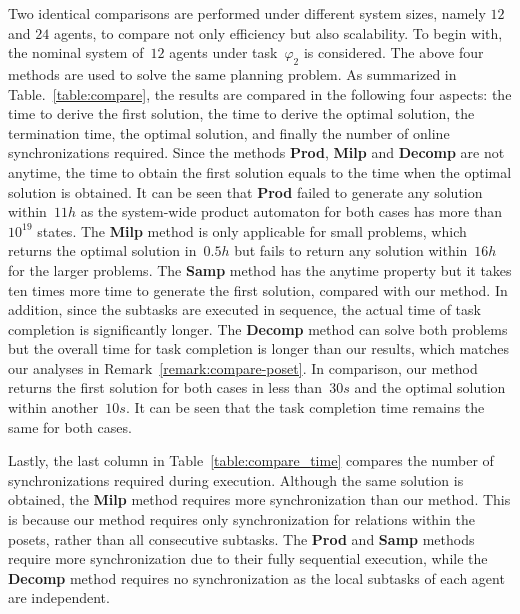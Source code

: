 Two identical comparisons are performed under different system sizes,
namely $12$ and $24$ agents, to compare not only efficiency but also scalability.
To begin with, the nominal system of~$12$ agents under task~$\varphi_2$ is considered.
The above four methods are used to solve the same planning problem.
As summarized in Table.~\ref{table:compare},
the results are compared in the following four aspects:
the time to derive the first solution,
the time to derive the optimal solution,
the termination time, the optimal solution,
and finally the number of online synchronizations required.
Since the methods \textbf{Prod}, \textbf{Milp} and \textbf{Decomp} are not
anytime, the time to obtain  the first solution equals to the time
when the optimal solution is obtained.
It can be seen that \textbf{Prod} failed to generate any solution
within~$11h$ as the system-wide product automaton for both cases
has more than $10^{19}$ states.
The \textbf{Milp} method is only applicable for small problems,
which returns the optimal solution in~$0.5h$ but fails to
return any solution within~$16h$ for the larger problems.
The \textbf{Samp} method has the anytime property but it takes ten times
more time to generate
the first  solution, compared with our method.
In addition, since the subtasks are executed in sequence,
the actual time of task completion is significantly longer.
The \textbf{Decomp} method can solve both problems but the overall time
for task completion is longer than our results,
which matches our analyses in Remark~\ref{remark:compare-poset}.
In comparison, our method returns the first solution for both cases in less
than~$30s$ and the optimal solution within another~$10s$.
It can be seen that the task completion time remains the same for both cases.

Lastly, the last column in Table~\ref{table:compare_time} compares the number
of synchronizations required during execution.
Although the same solution is obtained, the \textbf{Milp} method requires more
synchronization than our method.
This is because our method requires only synchronization for relations within the
posets, rather than all consecutive subtasks.
The \textbf{Prod} and \textbf{Samp} methods require more synchronization due to
their fully sequential execution,
while the \textbf{Decomp} method requires no synchronization as
the local subtasks of each agent are independent.
